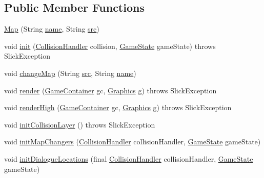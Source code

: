 \subsection*{Public Member Functions}
\begin{DoxyCompactItemize}
\item 
\mbox{\hyperlink{classentities_1_1_map_af46803f47cfa8c8714c5a7970fb5c334}{Map}} (String \mbox{\hyperlink{classentities_1_1_map_a969750cbb3acef375d33040e29be91f0}{name}}, String \mbox{\hyperlink{classentities_1_1_map_a15025d8ae6bb3627fb145ce75013b011}{src}})
\item 
void \mbox{\hyperlink{classentities_1_1_map_a183d1b160c442fc50c37cf0cb956f5cd}{init}} (\mbox{\hyperlink{classentities_1_1_collision_handler}{Collision\+Handler}} collision, \mbox{\hyperlink{classstates_1_1_game_state}{Game\+State}} game\+State)  throws Slick\+Exception 
\item 
void \mbox{\hyperlink{classentities_1_1_map_aa6e658d7d233c2f7d52d10e65d8f3d8e}{change\+Map}} (String \mbox{\hyperlink{classentities_1_1_map_a15025d8ae6bb3627fb145ce75013b011}{src}}, String \mbox{\hyperlink{classentities_1_1_map_a969750cbb3acef375d33040e29be91f0}{name}})
\item 
void \mbox{\hyperlink{classentities_1_1_map_a2342f9740e05311c015fdcbd07c86f11}{render}} (\mbox{\hyperlink{classorg_1_1newdawn_1_1slick_1_1_game_container}{Game\+Container}} gc, \mbox{\hyperlink{classorg_1_1newdawn_1_1slick_1_1_graphics}{Graphics}} g)  throws Slick\+Exception 
\item 
void \mbox{\hyperlink{classentities_1_1_map_a5089d63a94806cd3e9d2bdd0d31a799e}{render\+High}} (\mbox{\hyperlink{classorg_1_1newdawn_1_1slick_1_1_game_container}{Game\+Container}} gc, \mbox{\hyperlink{classorg_1_1newdawn_1_1slick_1_1_graphics}{Graphics}} g)  throws Slick\+Exception 
\item 
void \mbox{\hyperlink{classentities_1_1_map_a870dbe1d4cad1c47b3a63a28267c32a9}{init\+Collision\+Layer}} ()  throws Slick\+Exception 
\item 
void \mbox{\hyperlink{classentities_1_1_map_a7ac25d4d491cdb9d26421146fc622978}{init\+Map\+Changers}} (\mbox{\hyperlink{classentities_1_1_collision_handler}{Collision\+Handler}} collision\+Handler, \mbox{\hyperlink{classstates_1_1_game_state}{Game\+State}} game\+State)
\item 
void \mbox{\hyperlink{classentities_1_1_map_ae795d01c06b1f04f16065702fa5e2801}{init\+Dialogue\+Locations}} (final \mbox{\hyperlink{classentities_1_1_collision_handler}{Collision\+Handler}} collision\+Handler, \mbox{\hyperlink{classstates_1_1_game_state}{Game\+State}} game\+State)

\end{DoxyCompactItemize}
